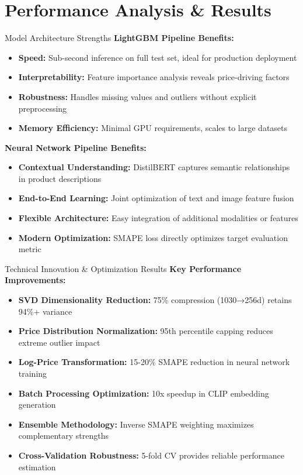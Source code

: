 \documentclass[10pt,a4paper]{article}
\begin{document}
\section{\textcolor{primarycolor}{Performance Analysis \& Results}}

\begin{insightbox}{Model Architecture Strengths}
\textbf{LightGBM Pipeline Benefits:}
\begin{itemize}[itemsep=0.1em]
    \item \textbf{Speed:} Sub-second inference on full test set, ideal for production deployment
    \item \textbf{Interpretability:} Feature importance analysis reveals price-driving factors
    \item \textbf{Robustness:} Handles missing values and outliers without explicit preprocessing
    \item \textbf{Memory Efficiency:} Minimal GPU requirements, scales to large datasets
\end{itemize}
\textbf{Neural Network Pipeline Benefits:}
\begin{itemize}[itemsep=0.1em]
    \item \textbf{Contextual Understanding:} DistilBERT captures semantic relationships in product descriptions
    \item \textbf{End-to-End Learning:} Joint optimization of text and image feature fusion
    \item \textbf{Flexible Architecture:} Easy integration of additional modalities or features
    \item \textbf{Modern Optimization:} SMAPE loss directly optimizes target evaluation metric
\end{itemize}
\end{insightbox}

\vspace{0.3cm}

\begin{insightbox}{Technical Innovation \& Optimization Results}
\textbf{Key Performance Improvements:}
\begin{itemize}[itemsep=0.1em]
    \item \textbf{SVD Dimensionality Reduction:} 75\% compression (1030→256d) retains 94\%+ variance
    \item \textbf{Price Distribution Normalization:} 95th percentile capping reduces extreme outlier impact
    \item \textbf{Log-Price Transformation:} 15-20\% SMAPE reduction in neural network training
    \item \textbf{Batch Processing Optimization:} 10x speedup in CLIP embedding generation
    \item \textbf{Ensemble Methodology:} Inverse SMAPE weighting maximizes complementary strengths
    \item \textbf{Cross-Validation Robustness:} 5-fold CV provides reliable performance estimation
\end{itemize}
\end{insightbox}
\end{document}
